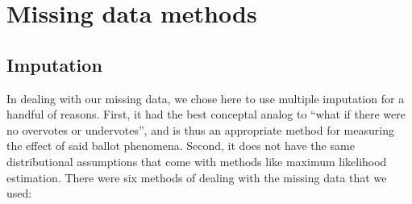 \documentclass[12pt,twoside]{reedthesis}
\begin{document}
\hypertarget{missing-methods}{%
\chapter{Missing data methods}\label{missing-methods}}

\hypertarget{imp-methods}{%
\section{Imputation}\label{imp-methods}}

In dealing with our missing data, we chose here to use multiple imputation for a handful of reasons. First, it had the best conceptal analog to ``what if there were no overvotes or undervotes'', and is thus an appropriate method for measuring the effect of said ballot phenomena. Second, it does not have the same distributional assumptions that come with methods like maximum likelihood estimation. There were six methods of dealing with the missing data that we used:
\end{document}

